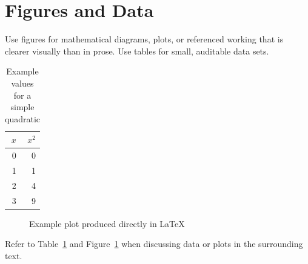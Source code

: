 \section{Figures and Data}

Use figures for mathematical diagrams, plots, or referenced working that is
clearer visually than in prose. Use tables for small, auditable data sets.

\begin{table}[H]
\centering
\caption{Example values for a simple quadratic}
\label{tab:example-values}
\begin{tabular}{@{}rr@{}}
\toprule
\(x\) & \(x^2\) \\
\midrule
0 & 0 \\
1 & 1 \\
2 & 4 \\
3 & 9 \\
\bottomrule
\end{tabular}
\end{table}

\begin{figure}[H]
    \centering
    \caption{Example plot produced directly in LaTeX}
    \label{fig:example-plot}
\end{figure}

Refer to Table~\ref{tab:example-values} and Figure~\ref{fig:example-plot} when
discussing data or plots in the surrounding text.
